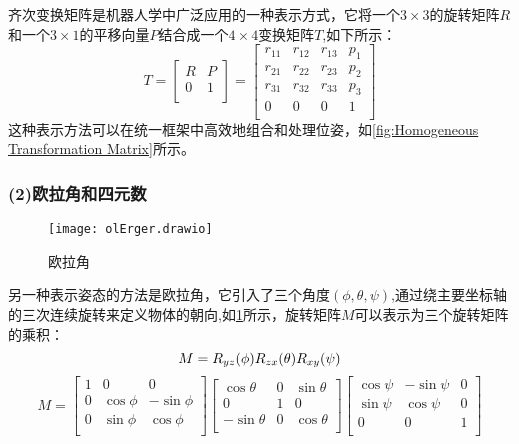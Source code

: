 齐次变换矩阵是机器人学中广泛应用的一种表示方式，它将一个$3\times3$的旋转矩阵$R$和一个$3\times1$的平移向量$P$结合成一个$4\times4$变换矩阵$T$,如下所示：
\begin{equation}
	\label{equ:Homogeneous Transformation Matrix}
	T=
	\begin{bmatrix}
		R & P \\
		0 & 1 \\
	\end{bmatrix}=
	\begin{bmatrix}
		r_{11} & r_{12} & r_{13} & p_{1} \\
		r_{21} & r_{22} & r_{23} & p_{2} \\
		r_{31} & r_{32} & r_{33} & p_{3} \\
		0 & 0 & 0 & 1 \\
	\end{bmatrix}
\end{equation}
这种表示方法可以在统一框架中高效地组合和处理位姿，如\cref{fig:Homogeneous Transformation Matrix}所示。

 \subsubsection*{(2)欧拉角和四元数}
 
 \begin{figure}[htb]
 	\texttt{[image: olErger.drawio]}
 	\caption[欧拉角]{欧拉角} %
 	\label{fig: olErger.drawio}
 \end{figure}
 
另一种表示姿态的方法是欧拉角，它引入了三个角度$(\phi,\theta,\psi)$,通过绕主要坐标轴的三次连续旋转来定义物体的朝向,如\cref{fig: olErger.drawio}所示，旋转矩阵$M$可以表示为三个旋转矩阵的乘积：
\begin{equation}
	\label{equ:oulEqu_1}
	M =R_{yz}(\phi)R_{zx}(\theta)R_{xy}(\psi) \\
\end{equation}
\begin{equation}
	\label{equ:oulEqu_2}
	M =
	\begin{bmatrix}
		1 & 0& 0  \\
		0 & \cos\phi & -\sin\phi \\
		0 & \sin\phi & \cos\phi  \\
	\end{bmatrix}
	\begin{bmatrix}
		\cos\theta & 0& \sin\theta  \\
		0 & 1 & 0 \\
		-\sin\theta & 0 & \cos\theta  \\
	\end{bmatrix}
	\begin{bmatrix}
		\cos\psi & -\sin\psi& 0  \\
		\sin\psi & \cos\psi & 0 \\
		0 & 0 & 1  \\
	\end{bmatrix}
\end{equation}

